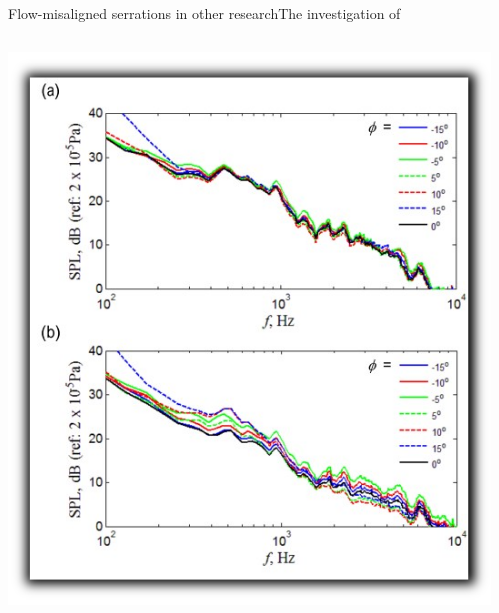 \documentclass[xcolor=table,aspectratio=169]{beamer}
\begin{document}
\begin{frame}[c]{Flow-misaligned serrations in other research}{The investigation of \cite{Vathylakis2016}}
\begin{columns}
\begin{center}
            \includegraphics[width=1.00\textwidth]{media/Vathylakis1.png}
        \end{center}
        \begin{center}

\end{center}
\end{columns}
\end{frame}
\end{document}
